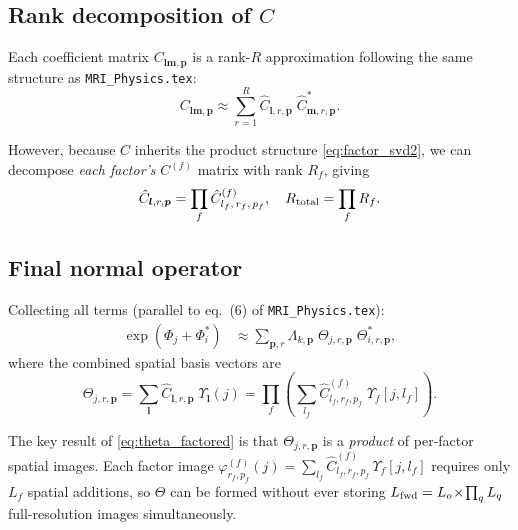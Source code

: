 \documentclass{article}
\begin{document}
\subsection{Rank decomposition of $C$}

Each coefficient matrix $C_{\boldsymbol{l}\boldsymbol{m},\boldsymbol{p}}$ is a rank-$R$
approximation following the same structure as \texttt{MRI\_Physics.tex}:
\begin{equation}
    C_{\boldsymbol{l}\boldsymbol{m},\boldsymbol{p}} \approx \sum_{r=1}^R
    \hat{C}_{\boldsymbol{l},r,\boldsymbol{p}}\;\hat{C}^*_{\boldsymbol{m},r,\boldsymbol{p}}.
\end{equation}

However, because $C$ inherits the product structure \eqref{eq:factor_svd2}, we can
decompose \emph{each factor's} $C^{(f)}$ matrix with rank $R_f$, giving
\begin{equation}
    \hat{C}_{\boldsymbol{l},r,\boldsymbol{p}} = \prod_f \hat{C}^{(f)}_{l_f,\,r_f,\,p_f},
    \quad R_{\rm total} = \prod_f R_f.
\end{equation}

\subsection{Final normal operator}

Collecting all terms (parallel to eq.~(6) of \texttt{MRI\_Physics.tex}):
\begin{align}
    \exp(\Phi_j + \Phi_i^*) &\approx
    \sum_{\boldsymbol{p},r} \Lambda_{k,\boldsymbol{p}}\;\Theta_{j,r,\boldsymbol{p}}\;\Theta^*_{i,r,\boldsymbol{p}},
    \label{eq:final_normal_factored}
\end{align}
where the combined spatial basis vectors are
\begin{equation}
    \Theta_{j,r,\boldsymbol{p}} = \sum_{\boldsymbol{l}} \hat{C}_{\boldsymbol{l},r,\boldsymbol{p}}\;\Upsilon_{\boldsymbol{l}}(j)
    = \prod_f \left(\sum_{l_f} \hat{C}^{(f)}_{l_f,r_f,p_f}\;\Upsilon_f[j,l_f]\right).
    \label{eq:theta_factored}
\end{equation}

The key result of \eqref{eq:theta_factored} is that $\Theta_{j,r,\boldsymbol{p}}$ is
a \emph{product} of per-factor spatial images.  Each factor image
$\varphi^{(f)}_{r_f,p_f}(j) = \sum_{l_f} \hat{C}^{(f)}_{l_f,r_f,p_f}\,\Upsilon_f[j,l_f]$
requires only $L_f$ spatial additions, so $\Theta$ can be formed without ever storing
$L_{\rm fwd} = L_o\!\times\!\prod_q L_q$ full-resolution images simultaneously.
\end{document}
